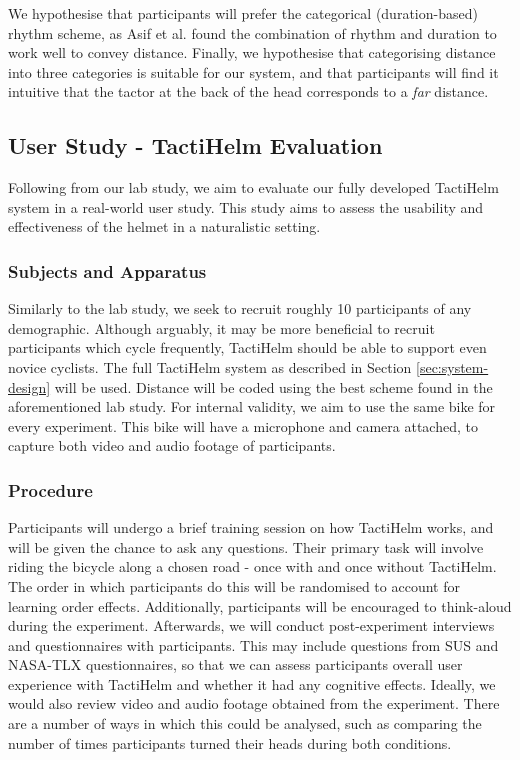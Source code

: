 \documentclass{interim}
\begin{document}
We hypothesise that participants will prefer the categorical (duration-based) rhythm scheme, as Asif et al. \cite{10.1145/1868914.1868923} found the combination of rhythm and duration to work well to convey distance. Finally, we hypothesise that categorising distance into three categories is suitable for our system, and that participants will find it intuitive that the tactor at the back of the head corresponds to a \textit{far} distance.


\subsection{User Study - TactiHelm Evaluation}\label{sec:user-study}
Following from our lab study, we aim to evaluate our fully developed TactiHelm system in a real-world user study. This study aims to assess the usability and effectiveness of the helmet in a naturalistic setting.

\subsubsection{Subjects and Apparatus}
Similarly to the lab study, we seek to recruit roughly 10 participants of any demographic. Although arguably, it may be more beneficial to recruit participants which cycle frequently, TactiHelm should be able to support even novice cyclists. The full TactiHelm system as described in Section \ref{sec:system-design} will be used. Distance will be coded using the best scheme found in the aforementioned lab study. For internal validity, we aim to use the same bike for every experiment. This bike will have a microphone and camera attached, to capture both video and audio footage of participants.

\subsubsection{Procedure}
Participants will undergo a brief training session on how TactiHelm works, and will be given the chance to ask any questions. Their primary task will involve riding the bicycle along a chosen road - once with and once without TactiHelm. The order in which participants do this will be randomised to account for learning order effects. Additionally, participants will be encouraged to think-aloud during the experiment. Afterwards, we will conduct post-experiment interviews and questionnaires with participants. This may include questions from SUS and NASA-TLX questionnaires, so that we can assess participants overall user experience with TactiHelm and whether it had any cognitive effects. Ideally, we would also review video and audio footage obtained from the experiment. There are a number of ways in which this could be analysed, such as comparing the number of times participants turned their heads during both conditions.
\end{document}

